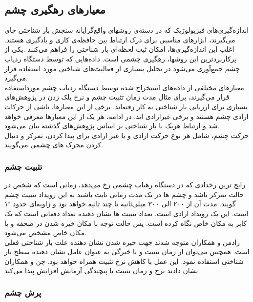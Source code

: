 \subsection{معیار‌های رهگیری چشم}
\label{ss:EyeMeasure}
اندازه‌گيری‌های فيزیولوژیک كه در دسته‌ی روشهای واقع‌گرایانه سنجش بار شناختی جای می‌گيرند،
ابزارهای مناسبی برای درک ارتباط بين حافظه‌ی كاری و یادگيری هستند. اغلب این اندازه‌گيری‌ها، امکان 
ثبت لحظه‌ای بار شناختی را فراهم می‌كنند .یکی از پركاربردترین این روشها، رهگيری چشمی است. 
داده‌هایی كه توسط دستگاه ردیاب چشم 
جمع‌آوری می‌شود در تحليل بسياری از فعاليت‌های شناختی
مورد استفاده قرار می‌گيرد.
\\
معيارهای مختلفی از داده‌های استخراج شده توسط دستگاه ردیاب چشم مورداستفاده قرار می‌گيرند،
برای مثال مدت زمان تثبيت چشم و نرخ پلک زدن در پژوهش‌های بسياری برای ارزیابی بار شناختی به كار 
رفته‌اند. برخی از این معيارها، ناشی از حركات ارادی چشم هستند و برخی غيرارادی اند. در ادامه، هر یک 
از این معيارها معرفی  خواهد  شد  و  ارتباط  هریک با  بار  شناختی بر  اساس  پژوهش‌های گذشته  بيان
می‌شود.
\\
حرکت چشم، شامل هر نوع حرکت ارادی و یا غیر ارادی برای پیدا کردن، تمرکز و دنبال کردن محرک های چشمی می‌گویند.

\subsubsection{تثبیت چشم}
رایج ترین رخدادی که در دستگاه رهیاب چشمی رخ می‌دهد، زمانی است که شخص در حالت تمرکز باشد و چشم ها در یک مدت زمانی ثابت باشند به این رویداد تثبیت چشم
گویند. مدت آن از ۲۰۰ الی ۳۰۰ میلی‌ثانیه تا چند ثانیه خواهد بود و زاویه‌ای حدود 
$^\circ$۱
 است. این یک رویداد ارادی است. تعداد تثبیت ها نشان دهنده تعداد دفعاتی است که یک کابر به مکان خاص
نگاه کرده است.
پس حالت توجه با مکان خیره شدن در صحفه و یا مکان خاص مشخص می‌شود.
\\
رادمن و همکاران 
\cite{rudmann2003eyetracking}
متوجه شدند جهت خیره شدن نشان دهنده علت بار شناختی فعلی است. همچنین می‌توان از زمان تثبیت و یا خیرگی
به عنوان عامل نشان دهنده سطح بار شناختی استفاده نمود. این عمل با کاهش نرخ تثبیت همراه خواهد بود. چن و همکاران نشان دادند نرخ و زمان تثبیت با پیچیدگی آزمایش افزایش پیدا می‌کند.

\subsubsection{پرش چشم}

